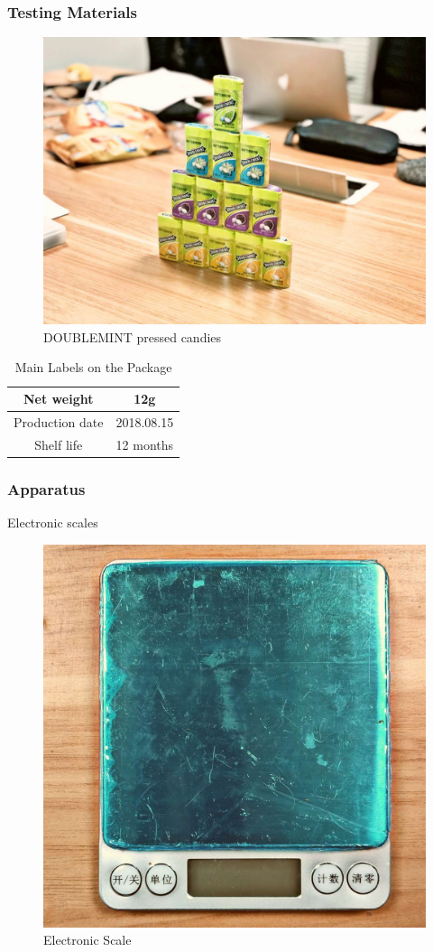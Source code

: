 \documentclass[a4paper]{article}
\begin{document}
\subsubsection{Testing Materials}
\begin{figure}[!htbp]
\centering
\includegraphics[width=0.5
\linewidth,angle=0]{sample.jpg}
\caption{DOUBLEMINT pressed candies}
\end{figure}

\begin{table}[!htbp]
\centering
\begin{tabular}{|c|c|}
\hline
Net weight&12g
\\\hline
Production date&2018.08.15
\\\hline
Shelf life&12 months
\\\hline
\end{tabular}
\caption{Main Labels on the Package}
\end{table}

\subsubsection{Apparatus}
Electronic scales
\begin{figure}[!htbp]
\centering
\includegraphics[width=0.5
\linewidth,angle=0]{scale.jpg}
\caption{Electronic Scale}
\end{figure}
\end{document}
